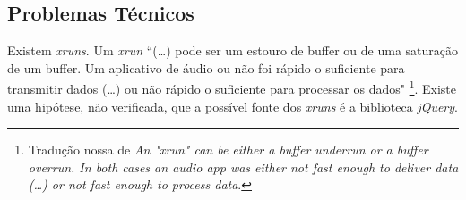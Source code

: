 \subsection*{Problemas Técnicos}

Existem \emph{xruns}. Um \emph{xrun} ``(\ldots) pode ser um estouro de buffer ou de uma saturação de um buffer. Um aplicativo de áudio ou não foi rápido o suficiente para transmitir dados (\ldots) ou não rápido o suficiente para processar os dados" \cite{markc_xruns_2013}\footnote{Tradução nossa de \emph{An "xrun" can be either a buffer underrun or a buffer overrun. In both cases an audio app was either not fast enough to deliver data (\ldots)  or not fast enough to process data}.}. Existe uma hipótese, não verificada, que a possível fonte dos \emph{xruns} é a biblioteca \emph{jQuery}. 